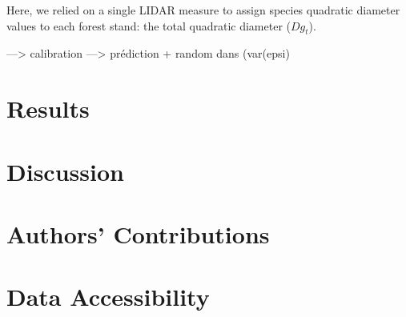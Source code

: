 \documentclass[a4paper]{article}
\begin{document}
Here, we relied on a single LIDAR measure to assign species quadratic diameter values to each forest stand: the total quadratic diameter ($Dg_t$).




---> calibration
---> prédiction + random dans (var(epsi)







\section*{Results}

\section*{Discussion}


\section*{Authors' Contributions}

\section*{Data Accessibility}



\end{document}
